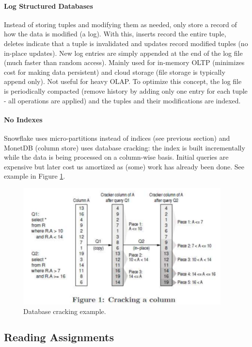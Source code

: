 \paragraph{Log Structured Databases}
Instead of storing tuples and modifying them as needed, only store a record of how the data is modified (a log). With this, inserts record the entire tuple, deletes indicate that a tuple is invalidated and updates record modified tuples (no in-place updates). New log entries are simply appended at the end of the log file (much faster than random access). Mainly used for in-memory OLTP (minimizes cost for making data persistent) and cloud storage (file storage is typically append only). Not useful for heavy OLAP. To optimize this concept, the log file is periodically compacted (remove history by adding only one entry for each tuple - all operations are applied) and the tuples and their modifications are indexed. %

\paragraph{No Indexes}
Snowflake uses micro-partitions instead of indices (see previous section) and MonetDB (column store) uses database cracking: the index is built incrementally while the data is being processed on a column-wise basis. Initial queries are expensive but later cost us amortized as (some) work has already been done. See example in Figure \ref{fig:crack}. %

\begin{figure}[h]
	\centering
	\includegraphics[scale=0.8]{images/2-crack.PNG}
	\caption{Database cracking example.}
	\label{fig:crack}
\end{figure}





\subsection{Reading Assignments}


